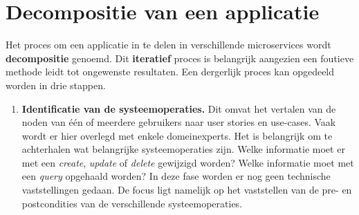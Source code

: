 	
	\chapter{Decompositie van een applicatie}
	Het proces om een applicatie in te delen in verschillende microservices wordt \textbf{decompositie} genoemd. Dit \textbf{iteratief} proces is belangrijk aangezien een foutieve methode leidt tot ongewenste resultaten. Een dergerlijk proces kan opgedeeld worden in drie stappen.
	\begin{enumerate}
		\item\textbf{Identificatie van de systeemoperaties.} Dit omvat het vertalen van de noden van één of meerdere gebruikers naar user stories en use-cases. Vaak wordt er hier overlegd met enkele domeinexperts. Het is belangrijk om te achterhalen wat belangrijke systeemoperaties zijn. Welke informatie moet er met een \textit{create}, \textit{update} of \textit{delete} gewijzigd worden? Welke informatie moet met een \textit{query} opgehaald worden? In deze fase worden er nog geen technische vaststellingen gedaan. De focus ligt namelijk op het vaststellen van de pre- en postcondities van de verschillende systeemoperaties.
		

\end{enumerate}
